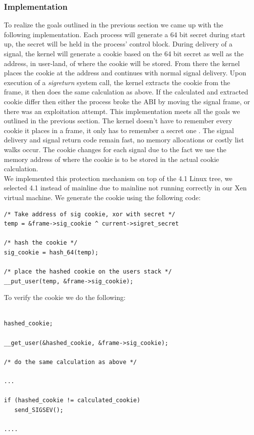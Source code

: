 \documentclass{sig-alternate-05-2015}
\begin{document}
\subsubsection{Implementation}
To realize the goals outlined in the previous section we came up with the following implementation. Each process will generate a 64 bit secret during start up, the secret will be held in the process' control block. During delivery of a signal, the kernel will generate a cookie based on the 64 bit secret as well as the address, in user-land, of where the cookie will be stored. From there the kernel places the cookie at the address and continues with normal signal delivery. Upon execution of a \textit{sigreturn} system call, the kernel extracts the cookie from the frame, it then does the same calculation as above. If the calculated and extracted cookie differ then either the process broke the ABI by moving the signal frame, or there was an exploitation attempt. This implementation meets all the goals we outlined in the previous section. The kernel doesn't have to remember every cookie it places in a frame, it only has to remember a secret one . The signal delivery and signal return code remain fast, no memory allocations or costly list walks occur. The cookie changes for each signal due to the fact we use the memory address of where the cookie is to be stored in the actual cookie calculation.
\\
\indent
We implemented this protection mechanism on top of the 4.1 Linux tree, we selected 4.1 instead of mainline due to mainline not running correctly in our Xen virtual machine. We generate the cookie using the following code:
\\
\begin{verbatim}
/* Take address of sig cookie, xor with secret */
temp = &frame->sig_cookie ^ current->sigret_secret

/* hash the cookie */
sig_cookie = hash_64(temp);

/* place the hashed cookie on the users stack */
__put_user(temp, &frame->sig_cookie);

\end{verbatim}

To verify the cookie we do the following:

\begin{verbatim}

hashed_cookie;

__get_user(&hashed_cookie, &frame->sig_cookie);

/* do the same calculation as above */

...

if (hashed_cookie != calculated_cookie)
   send_SIGSEV();

....

\end{verbatim}
\end{document}
